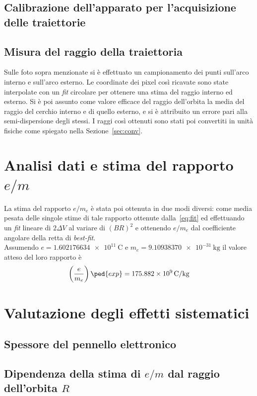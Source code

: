 \documentclass[10pt, a4paper, italian]{article}
\begin{document}
\subsection{Calibrazione dell'apparato per l'acquisizione delle traiettorie}

\subsection{Misura del raggio della traiettoria}
Sulle foto sopra menzionate si è effettuato un campionamento dei punti sull'arco interno e sull'arco esterno. Le coordinate dei pixel così ricavate sono state interpolate con un \emph{fit} circolare per ottenere una stima del raggio interno ed esterno. Si è poi assunto come valore efficace del raggio dell'orbita la media del raggio del cerchio interno e di quello esterno, e si è attribuito un errore pari alla semi-dispersione degli stessi. I raggi così ottenuti sono stati poi convertiti in unità fisiche come spiegato nella Sezione~\ref{sec:conv}. \\

\section{Analisi dati e stima del rapporto $e/m$}
La stima del rapporto $ e/m_{e} $ è stata poi ottenuta in due modi diversi: come media pesata delle singole stime di tale rapporto ottenute dalla~\eqref{eq:fit} ed effettuando un \emph{fit} lineare di $ 2\Delta V $ al variare di $ (B R)^{2} $ e ottenendo $ e/m_{e} $ dal coefficiente angolare della retta di \emph{best-fit}. \\
Assumendo $ e = \SI{1.602176634e11}{\coulomb} $ e $ m_{e} = \SI{9.10938370e-31}{\kilogram} $ il valore atteso del loro rapporto è
\begin{equation}\label{eq: e-m-exp}
    \left(\frac{e}{m_{e}}\right)\ped{exp} = \SI[]{ 175.882e9 }{ \coulomb/\kilogram }
\end{equation}

\section{Valutazione degli effetti sistematici}
\subsection{Spessore del pennello elettronico}

\subsection{Dipendenza della stima di $e/m$ dal raggio dell'orbita $R$}
\end{document}
